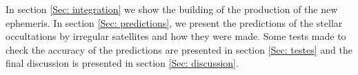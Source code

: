 
In section \ref{Sec: integration} we show the building of the production of the new ephemeris. In section \ref{Sec: predictions}, we present the predictions of the stellar occultations by irregular satellites and how they were made. Some tests made to check the accuracy of the predictions are presented in section \ref{Sec: testes} and the final discussion is presented in section \ref{Sec: discussion}.